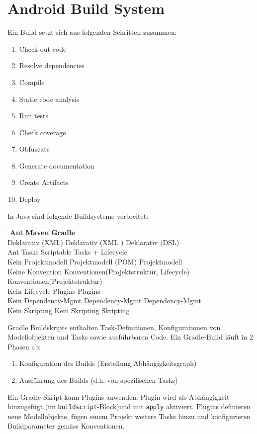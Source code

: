 \chapter{Android Build System}

Ein Build setzt sich aus folgenden Schritten zusammen:
\begin{enumerate}
	\item Check out code
	\item Resolve dependencies
	\item Compile
	\item Static code analysis
	\item Run tests
	\item Check coverage
	\item Obfuscate
	\item Generate documentation
	\item Create Artifacts
	\item Deploy
\end{enumerate}
In Java sind folgende Buildsysteme verbreitet:
\begin{tabbing}
	\hspace{5cm}\=\hspace{8cm}\=\kill
	\textbf{Ant} \> \textbf{Maven} \> \textbf{Gradle} \\ 
	Deklarativ (XML) \> Deklarativ (XML ) \> Deklarativ (DSL) \\ 
	Ant Tasks \>  \> Scriptable Tasks + Lifecycle \\ 
	Kein Projektmodell \> Projektmodell (POM) \> Projektmodell \\ 
	Keine Konvention \> Konventionen(Projektstruktur, Lifecycle)  \> Konventionen(Projektstruktur) \\ 
	Kein Lifecycle \> Plugins \> Plugins \\ 
	Kein Dependency-Mgmt \> Dependency-Mgmt \> Dependency-Mgmt \\ 
	Kein Skripting \> Kein Skripting \> Skripting
\end{tabbing}
Gradle Buildskripts enthalten Task-Definitionen, Konfigurationen von Modellobjekten und Tasks sowie ausführbaren Code. Ein Gradle-Build läuft in 2 Phasen ab:
\begin{enumerate}
	\item Konfiguration des Builds (Erstellung Abhängigkeitsgraph)
	\item Ausführung des Builds (d.h. von spezifischen Tasks)
\end{enumerate}
Ein Gradle-Skript kann Plugins anwenden. Plugin wird als Abhängigkeit hinzugefügt (im \texttt{buildscript}-Block)und mit \texttt{apply} aktiviert. Plugins definieren neue Modellobjekte, fügen einem Projekt weitere Tasks hinzu und konfigurieren Buildparameter gemäss Konventionen.

